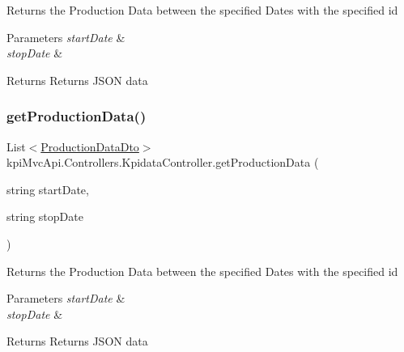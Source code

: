 Returns the Production Data between the specified Dates with the specified id 


\begin{DoxyParams}{Parameters}
{\em start\+Date} & \\
\hline
{\em stop\+Date} & \\
\hline
\end{DoxyParams}
\begin{DoxyReturn}{Returns}
Returns J\+S\+ON data
\end{DoxyReturn}
\mbox{\label{classkpi_mvc_api_1_1_controllers_1_1_kpidata_controller_a27722d65abe0781d4b670c84c2e07a76}} 
\subsubsection{\texorpdfstring{get\+Production\+Data()}{getProductionData()}\hspace{0.1cm}{\footnotesize\ttfamily [6/6]}}
{\footnotesize\ttfamily List$<$\hyperlink{classkpi_mvc_api_1_1_data_transfer_objects_1_1_production_data_dto}{Production\+Data\+Dto}$>$ kpi\+Mvc\+Api.\+Controllers.\+Kpidata\+Controller.\+get\+Production\+Data (\begin{DoxyParamCaption}\item[{string}]{start\+Date,  }\item[{string}]{stop\+Date }\end{DoxyParamCaption})\hspace{0.3cm}{\ttfamily [inline]}}



Returns the Production Data between the specified Dates with the specified id 


\begin{DoxyParams}{Parameters}
{\em start\+Date} & \\
\hline
{\em stop\+Date} & \\
\hline
\end{DoxyParams}
\begin{DoxyReturn}{Returns}
Returns J\+S\+ON data
\end{DoxyReturn}
\mbox{\label{classkpi_mvc_api_1_1_controllers_1_1_kpidata_controller_ae0c16d6b3d009224eae6ea5a2b20aabd}} 
